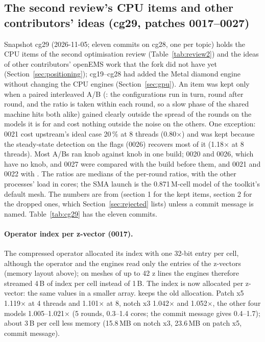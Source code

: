 \subsection{The second review's CPU items and other contributors' ideas (cg29, patches 0017--0027)}\label{sec:cg29}
Snapshot cg29 (2026-11-05; eleven commits on cg28, one per topic) holds the CPU items of the second optimisation
review (Table~\ref{tab:review2}) and the ideas of other contributors' openEMS work that the fork did not have yet
(Section~\ref{sec:positioning}); cg19--cg28 had added the Metal diamond engine without changing the CPU engines
(Section~\ref{sec:gpu}). An item was kept only when a paired interleaved A/B (: the
configurations run in turn, round after round, and the ratio is taken within each round, so a slow phase of the shared
machine hits both alike) gained clearly outside the spread of the rounds on the models it is for and cost nothing
outside the noise on the others. One exception: 0021 cost upstream's ideal case 20\,\% at 8 threads (0.80$\times$)
and was kept because the steady-state detection on the flags (0026) recovers most of it (1.18$\times$ at 8 threads).
Most A/Bs ran knob against knob in one build; 0020 and 0026, which have no knob, and
0027 were compared with the build before them, and 0021 and 0022 with . The ratios are medians
of the per-round ratios,
with the other processes' load in cores; the SMA launch is the 0.871\,M-cell model of the toolkit's default mesh. The
numbers are from  (section 1 for the kept items, section 2 for the
dropped ones, which Section~\ref{sec:rejected} lists) unless a commit message is named. Table~\ref{tab:cg29} has the
eleven commits.

\paragraph{Operator index per z-vector (0017).} The compressed operator allocated its index with one 32-bit entry per
cell, although the operator and the engines read only the entries of the z-vectors (memory layout above); on meshes of
up to 42 z lines the engines therefore streamed 4\,B of index per cell instead of 1\,B. The index is now allocated
per z-vector: the same values in a smaller array.  keeps the old allocation.
Patch x5 1.119$\times$ at 4 threads and 1.101$\times$ at 8, notch x3 1.042$\times$ and 1.052$\times$, the other four
models 1.005--1.021$\times$ (5 rounds, 0.3--1.4 cores; the commit message gives 0.4--1.7);
about 3\,B per cell less memory (15.8\,MB on notch x3, 23.6\,MB on patch x5, commit message).

